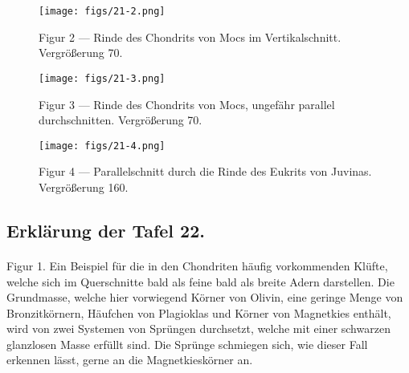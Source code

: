 \documentclass[a4paper, 12pt, oneside]{article}
\begin{document}
\vspace*{\fill}
\begin{figure}[H]
\centering
\texttt{[image: figs/21-2.png]}
\caption{\small Figur 2 --- Rinde des Chondrits von Mocs im Vertikalschnitt. Vergrößerung 70.}
\end{figure}
\vspace*{\fill}
\clearpage

\vspace*{\fill}
\begin{figure}[H]
\centering
\texttt{[image: figs/21-3.png]}
\caption{\small Figur 3 --- Rinde des Chondrits von Mocs, ungefähr parallel durchschnitten. Vergrößerung 70.}
\end{figure}
\vspace*{\fill}
\clearpage

\vspace*{\fill}
\begin{figure}[H]
\centering
\texttt{[image: figs/21-4.png]}
\caption{\small Figur 4 --- Parallelschnitt durch die Rinde des Eukrits von Juvinas. Vergrößerung 160.}
\end{figure}
\vspace*{\fill}
\clearpage

\subsection{Erklärung der Tafel 22.}
\paragraph{}
Figur 1. Ein Beispiel für die in den Chondriten häufig vorkommenden Klüfte, welche sich im Querschnitte bald als feine bald als breite Adern darstellen. Die Grundmasse, welche hier vorwiegend Körner von Olivin, eine geringe Menge von Bronzitkörnern, Häufchen von Plagioklas und Körner von Magnetkies enthält, wird von zwei Systemen von Sprüngen durchsetzt, welche mit einer schwarzen glanzlosen Masse erfüllt sind. Die Sprünge schmiegen sich, wie dieser Fall erkennen lässt, gerne an die Magnetkieskörner an.
\end{document}
